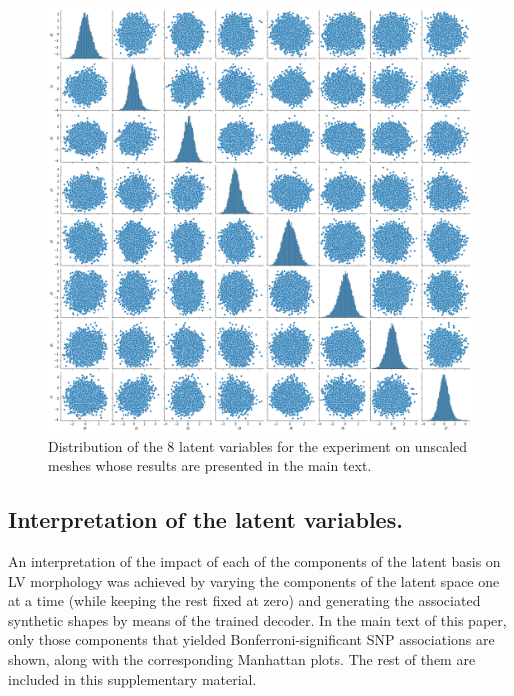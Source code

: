 \begin{figure}
 \centering
 \includegraphics[width=\textwidth]{figs/supplementary/z_distribution.png}
 \caption{Distribution of the 8 latent variables for the experiment on unscaled meshes whose results are presented in the main text.}
 \label{fig:z_distribution}
\end{figure}

\subsection{Interpretation of the latent variables.} An interpretation of the impact of each of the components of the latent basis on LV morphology was achieved by varying the components of the latent space one at a time (while keeping the rest fixed at zero) and generating the associated synthetic shapes by means of the trained decoder. %
In the main text of this paper, only those components that yielded Bonferroni-significant SNP associations are shown, along with the corresponding Manhattan plots. The rest of them are included in this supplementary material.

